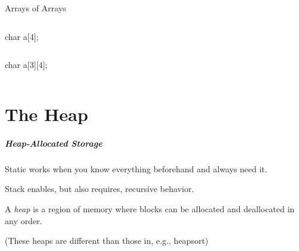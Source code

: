 \documentclass{plt}
\begin{document}
\begin{frame}[fragile]{Arrays of Arrays}
\begin{columns}
  \begin{column}{0.3\textwidth}
\begin{C}
char a[4];
\end{C}
  \end{column}
  \begin{column}{0.7\textwidth}
  \end{column}
\end{columns}

\vspace{3pc}

\begin{columns}
  \begin{column}{0.3\textwidth}
\begin{C}
char a[3][4];
\end{C}
  \end{column}
  \begin{column}{0.7\textwidth}
  \end{column}
\end{columns}
\end{frame}

\part{The Heap}
\frame{\partpage}

\begin{frame}
  \frametitle{Heap-Allocated Storage}

Static works when you know everything beforehand and always need it.

Stack enables, but also requires, recursive behavior.

A \emph{heap} is a region of memory where blocks can be allocated and
deallocated in any order.

(These heaps are different than those in, e.g., heapsort)

\end{frame}
\end{document}
